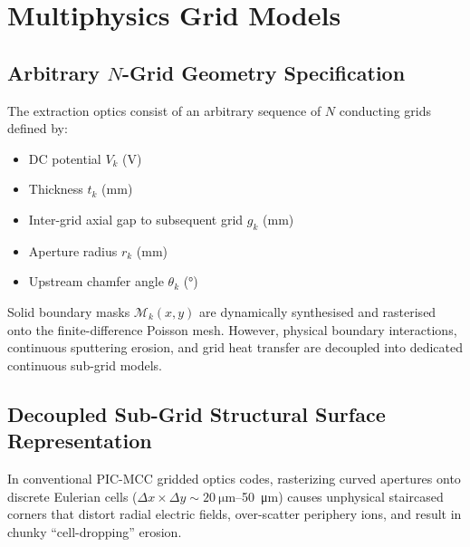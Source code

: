 \documentclass[11pt,a4paper]{article}
\begin{document}
\section{Multiphysics Grid Models}

\subsection{Arbitrary $N$-Grid Geometry Specification}

The extraction optics consist of an arbitrary sequence of $N$ conducting grids defined by:
\begin{itemize}[nosep]
    \item DC potential $V_k$ (\si{\volt})
    \item Thickness $t_k$ (\si{\milli\meter})
    \item Inter-grid axial gap to subsequent grid $g_k$ (\si{\milli\meter})
    \item Aperture radius $r_k$ (\si{\milli\meter})
    \item Upstream chamfer angle $\theta_k$ (\si{\degree})
\end{itemize}

Solid boundary masks $\mathcal{M}_k(x,y)$ are dynamically synthesised and rasterised onto the finite-difference Poisson mesh. However, physical boundary interactions, continuous sputtering erosion, and grid heat transfer are decoupled into dedicated continuous sub-grid models.

\subsection{Decoupled Sub-Grid Structural Surface Representation}
\label{sec:subgrid_surface}

In conventional PIC-MCC gridded optics codes, rasterizing curved apertures onto discrete Eulerian cells ($\Delta x \times \Delta y \sim \SI{20}{\micro\meter}$--\SI{50}{\micro\meter}) causes unphysical staircased corners that distort radial electric fields, over-scatter periphery ions, and result in chunky ``cell-dropping'' erosion. 
\end{document}

